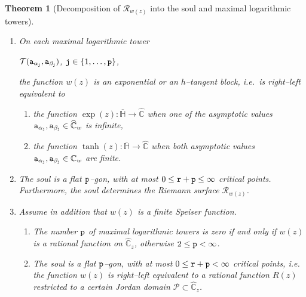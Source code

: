 \documentclass[final,3p,times]{elsarticle}
\newcommand{\CC}{\ensuremath{{\mathbb C}}}
\newcommand{\CW}{\ensuremath{{\widehat{\mathbb C}}}}
\newcommand{\HH}{\ensuremath{{\mathbb H}}}
\newcommand{\R}{\ensuremath{{\mathcal R}}}
\newcommand{\msigma}{\ensuremath{{\mathfrak{a}}}}
\newcommand{\mrho}{\ensuremath{{\mathfrak{r}}}}
\newtheorem{theorem}{Theorem}[section]
\theoremstyle{definition}
\begin{document}
\begin{theorem}[Decomposition of $\R_{w(z)}$ into the soul and maximal logarithmic towers]
\begin{enumerate}[label=\arabic*),leftmargin=*]
\centerline{
$\{ 
\underbrace{
\overline{{\tt a}_{\alpha_1} {\tt a}_{\beta_1}  } , 
\ldots  ,
\overline{{\tt a}_{\alpha_{\tt p} } {\tt a}_{\beta_{\tt p} } }
}_{\star\mbox{--boundary} }
\} 
\subseteq 
\{ \overline{{\tt w}_{{\tt j}( \msigma )} {\tt w}_{{\tt j}( \mrho )} }  \}$,
}

\noindent 
where $\star$--boundary coincides with the boundary of the 
maximal logarithmic towers.

\item 
On each maximal logarithmic tower 

\centerline{
$\mathcal{T}( {\tt a}_{\alpha_{\tt j}} , {\tt a}_{\beta_{\tt j}} )$,
\quad
${\tt j}\in\{1,\ldots,{\tt p} \}$, 
}

\noindent 
the function $w(z)$ 
is an exponential or an $h$--tangent block, 
\emph{i.e.}\ 
is right--left equivalent to 
\begin{enumerate}[label=\alph*),leftmargin=*]

\item 
the function $\exp(z): \overline{\HH} \longrightarrow \CW$ 
when one of the asymptotic values 
$ {\tt a}_{\alpha_{\tt j}} , {\tt a}_{\beta_{\tt j}} \in\CW_w$ 
is infinite,

\item 
the function $\tanh (z): \overline{\HH} \longrightarrow \CW$ 
when both asymptotic values 
$ {\tt a}_{\alpha_{\tt j}}, {\tt a}_{\beta_{\tt j}} \in\CC_w$ are finite.

\end{enumerate}

\item 
The soul is a flat $\tt p $--gon,
with at most 
$0 \leq {\tt r} + {\tt p} \leq \infty$
critical points. 
Furthermore, the soul determines the Riemann surface $\R_{w(z)}$.


\item 
Assume in addition that
$w(z)$ is a finite Speiser function. 
\begin{enumerate}[label=\alph*),leftmargin=*]
\item
The number $\tt p$ of maximal logarithmic towers is zero 
if and only if $w(z)$ is a rational function on $\CW_z$,
otherwise $2 \leq {\tt p} < \infty$.

\item
The soul is a flat $\tt p $--gon, 
with at most 
$0 \leq {\tt r} + {\tt p} < \infty$
critical points,
\emph{i.e.} the function $w(z)$ is right--left 
equivalent to a rational function 
$R(z)$ restricted to a certain Jordan domain 
$\mathscr{P}\subset\CW_z$.
\end{enumerate}
\end{enumerate}
\end{theorem}
\end{document}
